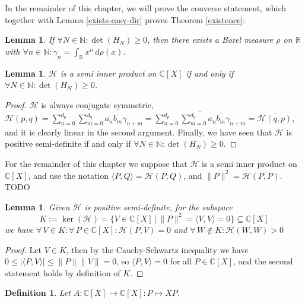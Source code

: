\documentclass[12pt,oneside]{report}
\newtheorem{lem}[thm]{Lemma}
\newtheorem{defn}[thm]{Definition}
\begin{document}
In the remainder of this chapter, we will prove the converse statement, which together with Lemma \ref{exists-easy-dir} proves Theorem \ref{existence}:

\begin{lem}
    If $\forall N \in \mathbb{N}: \det(H_{N}) \geq 0$, then there exists a Borel measure $\rho$ on $\mathbb{R}$ with $\forall n \in \mathbb{N}: \gamma_{n} = \int _{\mathbb{R}} x^{n} \, d\rho(x)$.
\end{lem}

\begin{lem}
    $\mathcal{H}$ is a semi inner product on $\mathbb{C}[X]$ if and only if $\forall N \in \mathbb{N}: \det(H_{N}) \geq 0$.
\end{lem}
\begin{proof}
    $\mathcal{H}$ is always conjugate symmetric, $\mathcal{H}(p,q) = \sum_{n=0}^{d_{p}}\sum_{m=0}^{d_{q}} \overline{a_{n}}b_{m}\gamma_{n+m} = \overline{\sum_{n=0}^{d_{p}}\sum_{m=0}^{d_{q}} a_{n}\overline{b_{m}}\gamma_{n+m}} = \overline{\mathcal{H}(q,p)}$, and it is clearly linear in the second argument. Finally, we have seen that $\mathcal{H}$ is positive semi-definite if and only if $\forall N \in \mathbb{N}: \det(H_{N}) \geq 0$.
\end{proof}

For the remainder of this chapter we suppose that $\mathcal{H}$ is a semi inner product on $\mathbb{C}[X]$, and use the notation $\langle P, Q \rangle = \mathcal{H}(P,Q)$, and $\|P\|^{2} = \mathcal{H}(P,P)$. TODO

\begin{lem}\label{subspaceK}
    Given $\mathcal{H}$ is positive semi-definite, for the subspace
    $$K := \ker(\mathcal{H}) = \{ V \in \mathbb{C}[X] \, | \, \|P\|^{2} = \langle V, V \rangle = 0 \} \subseteq \mathbb{C}[X]$$
    we have $\forall \, V \in K: \forall \, P \in \mathbb{C}[X]: \mathcal{H}(P,V) = 0$ and $\forall \, W \notin K: \mathcal{H}(W,W) > 0$
\end{lem}
\begin{proof}
    Let $V \in K$, then by the Cauchy-Schwartz inequality we have $0 \leq |\langle P, V \rangle| \leq \|P\|\|V\| = 0$, so $\langle P, V \rangle = 0$ for all $P \in \mathbb{C}[X]$, and the second statement holds by definition of $K$.
\end{proof}

\begin{defn}
    Let $A: \mathbb{C}[X] \to \mathbb{C}[X]: P \mapsto XP$.
\end{defn}
\end{document}
